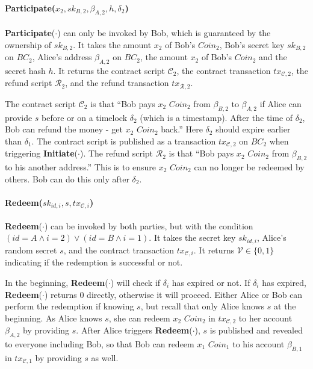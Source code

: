 \paragraph{\textbf{Participate}($x_2, sk_{B, 2}, \beta_{A, 2}, h, \delta_2$)}
\textbf{Participate}($\cdot$) can only be invoked by Bob, which is guaranteed by the ownership of $sk_{B, 2}$.
It takes the amount $x_2$ of Bob's $Coin_2$,
Bob's secret key $sk_{B, 2}$ on $BC_2$,
Alice's address $\beta_{A, 2}$ on $BC_2$,
the amount $x_2$ of Bob's $Coin_2$
and the secret hash $h$.
It returns the contract script $\mathcal{C}_2$,
the contract transaction $tx_{\mathcal{C}, 2}$,
the refund script $\mathcal{R}_2$,
and the refund transaction $tx_{\mathcal{R}, 2}$.

The contract script $\mathcal{C}_2$ is that ``Bob pays $x_2$ $Coin_2$ from $\beta_{B, 2}$ to $\beta_{A, 2}$ if Alice can provide $s$ before or on a timelock $\delta_2$ (which is a timestamp). After the time of $\delta_2$, Bob can refund the money - get $x_2$ $Coin_2$ back.''
Here $\delta_2$ should expire earlier than $\delta_1$.
The contract script is published as a transaction $tx_{\mathcal{C}, 2}$ on $BC_2$ when triggering \textbf{Initiate}($\cdot$).
The refund script $\mathcal{R}_2$ is that ``Bob pays $x_2$ $Coin_2$ from $\beta_{B, 2}$ to his another address.'' This is to ensure $x_2$ $Coin_2$ can no longer be redeemed by others. Bob can do this only after $\delta_2$.

\paragraph{\textbf{Redeem}($sk_{id, i}, s, tx_{\mathcal{C}, i}$)}
\textbf{Redeem}($\cdot$) can be invoked by both parties, but with the condition $(id = A \wedge i = 2) \vee (id = B \wedge i = 1)$.
It takes the secret key $sk_{id, i}$,
Alice's random secret $s$,
and the contract transaction $tx_{\mathcal{C}, i}$.
It returns $\mathcal{V} \in \{0, 1\}$ indicating if the redemption is successful or not.

In the beginning, \textbf{Redeem}($\cdot$) will check if $\delta_i$ has expired or not. If $\delta_i$ has expired, \textbf{Redeem}($\cdot$) returns $0$ directly, otherwise it will proceed.
Either Alice or Bob can perform the redemption if knowing $s$, but recall that only Alice knows $s$ at the beginning.
As Alice knows $s$, she can redeem $x_2$ $Coin_2$ in $tx_{\mathcal{C}, 2}$ to her account $\beta_{A, 2}$ by providing $s$.
After Alice triggers \textbf{Redeem}($\cdot$), $s$ is published and revealed to everyone including Bob, so that Bob can redeem $x_1$ $Coin_1$ to his account $\beta_{B, 1}$ in $tx_{\mathcal{C}, 1}$ by providing $s$ as well.

